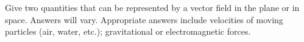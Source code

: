 {Give two quantities that can be represented by a vector field in the plane or in space.
}
{Answers will vary. Appropriate answers include velocities of moving particles (air, water, etc.); gravitational or electromagnetic forces.
}
